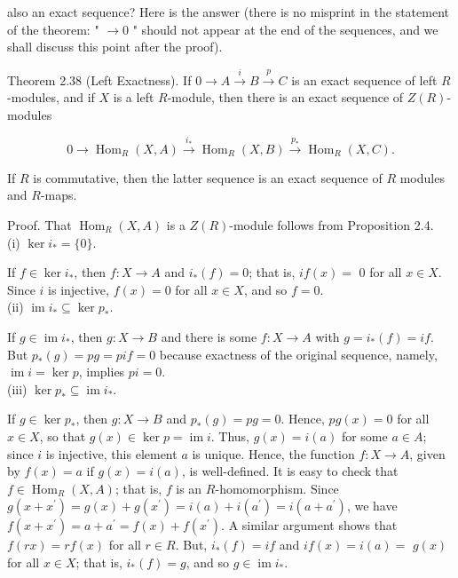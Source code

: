 \documentclass[10pt]{article}
\begin{document}
also an exact sequence? Here is the answer (there is no misprint in the statement of the theorem: " $\rightarrow 0$ " should not appear at the end of the sequences, and we shall discuss this point after the proof).

Theorem 2.38 (Left Exactness). If $0 \rightarrow A \xrightarrow{i} B \xrightarrow{p} C$ is an exact sequence of left $R$-modules, and if $X$ is a left $R$-module, then there is an exact sequence of $Z(R)$-modules

$$
0 \rightarrow \operatorname{Hom}_{R}(X, A) \xrightarrow{i_{*}} \operatorname{Hom}_{R}(X, B) \xrightarrow{p_{*}} \operatorname{Hom}_{R}(X, C) .
$$

If $R$ is commutative, then the latter sequence is an exact sequence of $R$ modules and $R$-maps.

Proof. That $\operatorname{Hom}_{R}(X, A)$ is a $Z(R)$-module follows from Proposition 2.4.\\
(i) $\operatorname{ker} i_{*}=\{0\}$.

If $f \in \operatorname{ker} i_{*}$, then $f: X \rightarrow A$ and $i_{*}(f)=0$; that is, $i f(x)=$ 0 for all $x \in X$. Since $i$ is injective, $f(x)=0$ for all $x \in X$, and so $f=0$.\\
(ii) $\operatorname{im} i_{*} \subseteq \operatorname{ker} p_{*}$.

If $g \in \operatorname{im} i_{*}$, then $g: X \rightarrow B$ and there is some $f: X \rightarrow A$ with $g=i_{*}(f)=i f$. But $p_{*}(g)=p g=p i f=0$ because exactness of the original sequence, namely, $\operatorname{im} i=\operatorname{ker} p$, implies $p i=0$.\\
(iii) $\operatorname{ker} p_{*} \subseteq \operatorname{im} i_{*}$.

If $g \in \operatorname{ker} p_{*}$, then $g: X \rightarrow B$ and $p_{*}(g)=p g=0$. Hence, $p g(x)=0$ for all $x \in X$, so that $g(x) \in \operatorname{ker} p=\operatorname{im} i$. Thus, $g(x)=i(a)$ for some $a \in A$; since $i$ is injective, this element $a$ is unique. Hence, the function $f: X \rightarrow A$, given by $f(x)=a$ if $g(x)=i(a)$, is well-defined. It is easy to check that $f \in \operatorname{Hom}_{R}(X, A)$; that is, $f$ is an $R$-homomorphism. Since $g\left(x+x^{\prime}\right)=g(x)+g\left(x^{\prime}\right)=i(a)+i\left(a^{\prime}\right)=i\left(a+a^{\prime}\right)$, we have $f\left(x+x^{\prime}\right)=a+a^{\prime}=f(x)+f\left(x^{\prime}\right)$. A similar argument shows that $f(r x)=r f(x)$ for all $r \in R$. But, $i_{*}(f)=i f$ and $i f(x)=i(a)=$ $g(x)$ for all $x \in X$; that is, $i_{*}(f)=g$, and so $g \in \operatorname{im} i_{*}$.
\end{document}
